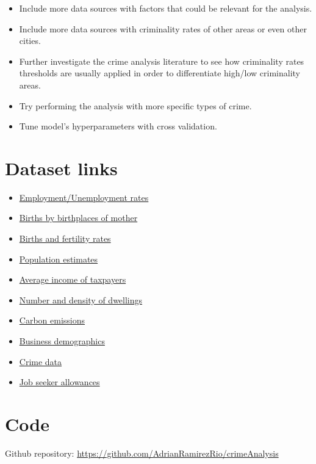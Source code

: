\documentclass[12pt, openany]{report}
\begin{document}
\begin{itemize}

\item Include more data sources with factors that could be relevant for the analysis.
\item Include more data sources with criminality rates of other areas or even other cities.
\item Further investigate the crime analysis literature to see how criminality rates thresholds are usually applied in order to differentiate high/low criminality areas.
\item Try performing the analysis with more specific types of crime.
\item Tune model's hyperparameters with cross validation.

\end{itemize}

\begin{appendices}
\chapter{Dataset links}
\begin{itemize}
\item \href{https://data.london.gov.uk/dataset/economic-activity-rate-employment-rate-and-unemployment-rate-ethnic-group-national/}{Employment/Unemployment rates}
\item \href{https://data.london.gov.uk/dataset/births-birthplace-mother-borough/}{Births by birthplaces of mother}
\item \href{https://data.london.gov.uk/dataset/births-and-fertility-rates-borough/}{Births and fertility rates}
\item 
\href{https://data.london.gov.uk/dataset/office-national-statistics-ons-population-estimates-borough}{Population estimates}
\item \href{https://data.london.gov.uk/dataset/average-income-tax-payers-borough/}{Average income of taxpayers}
\item \href{https://data.london.gov.uk/dataset/number-and-density-of-dwellings-by-borough/}{Number and density of dwellings}
\item \href{https://data.london.gov.uk/dataset/carbon-dioxide-emissions-borough/}{Carbon emissions}
\item \href{https://data.london.gov.uk/dataset/business-demographics-and-survival-rates-borough/}{Business demographics}
\item \href{http://maps.met.police.uk/tables.htm}{Crime data}
\item \href{https://data.london.gov.uk/dataset/job-seekers-allowance-claimants-borough/}{Job seeker allowances}
\end{itemize}

\chapter{Code}
\label{appendix:code}

Github repository: \url{https://github.com/AdrianRamirezRio/crimeAnalysis}	

\end{appendices}


\end{document}
